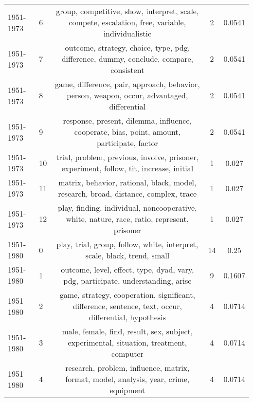 \begin{tabular}{llccc}
 1951-1973 &               6 &              group, competitive, show, interpret, scale, compete, escalation, free, variable, individualistic &                2 &                  0.0541 \\
 1951-1973 &               7 &                        outcome, strategy, choice, type, pdg, difference, dummy, conclude, compare, consistent &                2 &                  0.0541 \\
 1951-1973 &               8 &                   game, difference, pair, approach, behavior, person, weapon, occur, advantaged, differential &                2 &                  0.0541 \\
 1951-1973 &               9 &                    response, present, dilemma, influence, cooperate, bias, point, amount, participate, factor &                2 &                  0.0541 \\
 1951-1973 &              10 &                       trial, problem, previous, involve, prisoner, experiment, follow, tit, increase, initial &                1 &                   0.027 \\
 1951-1973 &              11 &                           matrix, behavior, rational, black, model, research, broad, distance, complex, trace &                1 &                   0.027 \\
 1951-1973 &              12 &                    play, finding, individual, noncooperative, white, nature, race, ratio, represent, prisoner &                1 &                   0.027 \\
 \midrule
 1951-1980 &               0 &                                      play, trial, group, follow, white, interpret, scale, black, trend, small &               14 &                    0.25 \\
 1951-1980 &               1 &                              outcome, level, effect, type, dyad, vary, pdg, participate, understanding, arise &                9 &                  0.1607 \\
 1951-1980 &               2 &         game, strategy, cooperation, significant, difference, sentence, text, occur, differential, hypothesis &                4 &                  0.0714 \\
 1951-1980 &               3 &                        male, female, find, result, sex, subject, experimental, situation, treatment, computer &                4 &                  0.0714 \\
 1951-1980 &               4 &                         research, problem, influence, matrix, format, model, analysis, year, crime, equipment &                4 &                  0.0714 \\

\end{tabular}
